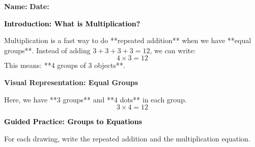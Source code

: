 \documentclass[12pt, letterpaper, fleqn]{article}
\begin{document}
\textbf{Name:} \underline{\hspace{5cm}}
\hfill
\textbf{Date:} \underline{\hspace{3cm}}\\

\begin{tcolorbox}[colback=customteal!20]
    \large\textcolor{black}{\textbf{Introduction: What is Multiplication?}}
\end{tcolorbox}

\vspace{3mm}
\noindent
Multiplication is a fast way to do **repeated addition** when we have **equal groups**. 
Instead of adding $3 + 3 + 3 + 3 = 12$, we can write:
\[
4 \times 3 = 12
\]
This means: **4 groups of 3 objects**.

\vspace{4mm}
\begin{tcolorbox}[colback=white, colframe=black!25, boxrule=0.6pt, arc=4mm]
\textbf{Visual Representation: Equal Groups}
\begin{center}
\end{center}
\noindent
Here, we have **3 groups** and **4 dots** in each group.
\[
3 \times 4 = 12
\]
\end{tcolorbox}

\newpage
\begin{tcolorbox}[colback=customteal!20]
    \large\textcolor{black}{\textbf{Guided Practice: Groups to Equations}}
\end{tcolorbox}

\vspace{4mm}
\noindent
For each drawing, write the repeated addition and the multiplication equation.
\end{document}
